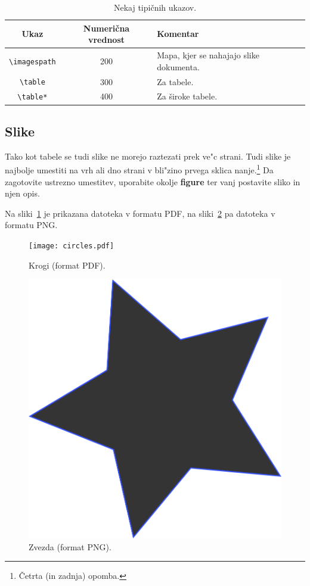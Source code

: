 \documentclass[sigconf,nonacm]{acmart}
\begin{document}
\begin{table}
    \centering
    \caption{Nekaj tipičnih ukazov.}
    \label{tab:table2}
    \begin{tabular}{ccl}
        \toprule
        Ukaz&Numerična vrednost&Komentar\\
        \midrule
        \texttt{\textbackslash{}imagespath} & 200 & Mapa, kjer se nahajajo slike dokumenta. \\
        \texttt{\textbackslash{}table} & 300 & Za tabele.\\
        \texttt{\textbackslash{}table*} & 400& Za široke tabele.\\
        \bottomrule
    \end{tabular}
\end{table}

\subsection{Slike}

Tako kot tabele se tudi slike ne morejo raztezati prek ve"c strani. Tudi slike
je najbolje umestiti na vrh ali dno strani v bli"zino prvega sklica
nanje.\footnote{Četrta (in zadnja) opomba.}  Da zagotovite ustrezno umestitev,
uporabite okolje \textbf{figure} ter vanj postavite sliko in njen opis.

Na sliki~\ref{fig:circles} je prikazana datoteka v formatu PDF, na
sliki~\ref{fig:star} pa datoteka v formatu PNG\@.

\begin{figure}
    \centering
    \texttt{[image: circles.pdf]}
    \caption{Krogi (format PDF).}
    \label{fig:circles}
\end{figure}

\begin{figure}
    \centering
    \includegraphics[scale=0.5]{star.png}
    \caption{Zvezda (format PNG).}
    \label{fig:star}
\end{figure}
\end{document}
